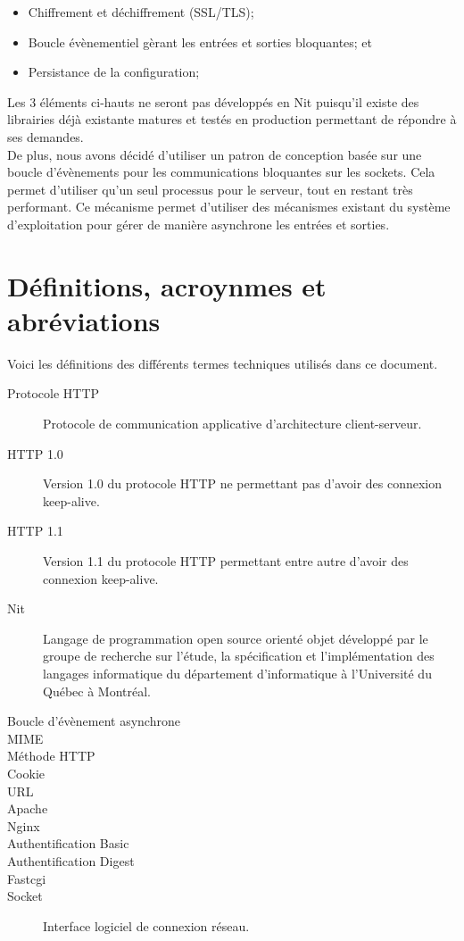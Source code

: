 \documentclass{scrreprt}
\begin{document}
\begin{itemize}
    \item Chiffrement et déchiffrement (SSL/TLS);
    \item Boucle évènementiel gèrant les entrées et sorties bloquantes; et
    \item Persistance de la configuration;
\end{itemize}

Les 3 éléments ci-hauts ne seront pas développés en Nit puisqu'il existe des
librairies déjà existante matures et testés en production permettant de répondre
à ses demandes.
\\
De plus, nous avons décidé d'utiliser un patron de conception basée sur
une boucle d'évènements pour les communications bloquantes sur les sockets. Cela
permet d'utiliser qu'un seul processus pour le serveur, tout en restant très performant.
Ce mécanisme permet d'utiliser des mécanismes existant du système d'exploitation pour
gérer de manière asynchrone les entrées et sorties\cite{c10k}.

\section{Définitions, acroynmes et abréviations}
Voici les définitions des différents termes techniques utilisés dans ce document.
\begin{description}
    \item[Protocole HTTP] Protocole de communication applicative d'architecture client-serveur\cite{http}.
    \item[HTTP 1.0] Version 1.0 du protocole HTTP ne permettant pas d'avoir des connexion keep-alive.
    \item[HTTP 1.1] Version 1.1 du protocole HTTP permettant entre autre d'avoir des connexion keep-alive\cite{http1.0}.
    \item[Nit] Langage de programmation open source orienté objet développé par le groupe de recherche sur l'étude, la spécification et l'implémentation des langages informatique du département d'informatique à l'Université du Québec à Montréal.
    \item[Boucle d'évènement asynchrone] 
    \item[MIME]
    \item[Méthode HTTP]
    \item[Cookie]
    \item[URL]
    \item[Apache]
    \item[Nginx]
    \item[Authentification Basic]
    \item[Authentification Digest]
    \item[Fastcgi]
    \item[Socket] Interface logiciel de connexion réseau.
\end{description}
\end{document}
